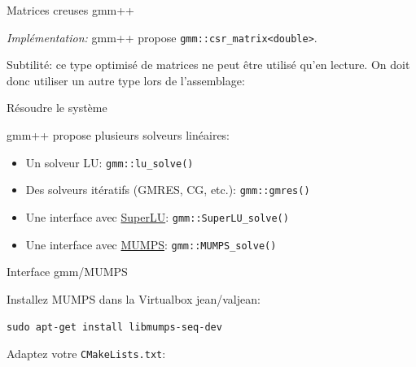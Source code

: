 \documentclass[
mode=present,    %
paper=a4paper,   %
orient=landscape,
display=slides,   %
size=10pt,     %
style=romain   %
]{powerdot}
\begin{document}
\begin{slide}[method=file,toc=]{Matrices creuses gmm++}  %

\emph{Implémentation:} gmm++ propose \verb$gmm::csr_matrix<double>$.

\bigskip

Subtilité: ce type optimisé de matrices ne peut être utilisé qu'en lecture. On doit donc utiliser un autre type lors de l'assemblage:

\bigskip



\end{slide}



\begin{slide}[method=file,toc=Solveur linéaire]{Résoudre le système}  %

gmm++ propose plusieurs solveurs linéaires:
\begin{itemize}
\item Un solveur LU: \verb$gmm::lu_solve()$
\item Des solveurs itératifs (GMRES, CG, etc.): \verb$gmm::gmres()$
\item Une interface avec \href{http://crd-legacy.lbl.gov/~xiaoye/SuperLU/}{SuperLU}: \verb$gmm::SuperLU_solve()$
\item Une interface avec \href{http://mumps.enseeiht.fr/}{MUMPS}: \verb$gmm::MUMPS_solve()$
\end{itemize}


\end{slide}



\begin{slide}[method=file,toc=]{Interface gmm/MUMPS}  %

Installez MUMPS dans la Virtualbox jean/valjean:

\begin{center}
\verb$sudo apt-get install libmumps-seq-dev$
\end{center}

\bigskip
Adaptez votre \verb$CMakeLists.txt$:



\end{slide}
\end{document}
